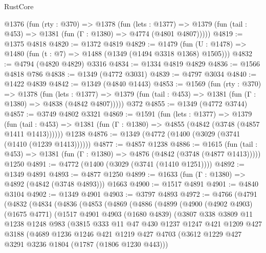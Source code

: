 \begin{lexlean}{RustCore}
\begin{coremodule}
  @1376
    (fun (rty : @370) =>
    @1378
      (fun (lets : @1377) =>
      @1379 (fun (tail : @453) => @1381 (fun (Γ : @1380) => @4774 (@4801 @4807)))))
@4819 := @1375 @4818
@4820 := @1372 @4819
@4829 := @1479 (fun (U : @1478) => @1480 (fun (t : @7) => @1488 (@1349 (@1494 @3318 @1368) @1505)))
@4832 := @4794 (@4820 @4829) @3316
@4834 := @1334 @4819 @4829
@4836 := @1566 @4818 @786
@4838 := @1349 (@4772 @3031)
@4839 := @4797 @3034
@4840 := @1422 @4839
@4842 := @1349 (@4840 @1443)
@4853 := @1569
    (fun (rty : @370) =>
    @1378
      (fun (lets : @1377) =>
      @1379 (fun (tail : @453) => @1381 (fun (Γ : @1380) => @4838 (@4842 @4807)))))
    @372
@4855 := @1349 (@4772 @3744)
@4857 := @3749 @4802 @3321
@4869 := @1591
    (fun (lets : @1377) =>
    @1379
      (fun (tail : @453) => @1381 (fun (Γ : @1380) => @4855 (@4842 (@3748 (@4857 @1411 @1413))))))
    @1238
@4876 := @1349 (@4772 (@1400 (@3029 (@3741 (@1410 (@1239 @1413))))))
@4877 := @4857 @1238
@4886 := @1615
    (fun (tail : @453) => @1381 (fun (Γ : @1380) => @4876 (@4842 (@3748 (@4877 @1413)))))
    @1250
@4891 := @4772 (@1400 (@3029 (@3741 (@1410 @1251))))
@4892 := @1349 @4891
@4893 := @4877 @1250
@4899 := @1633 (fun (Γ : @1380) => @4892 (@4842 (@3748 @4893))) @1663
@4900 := @1517 @4891
@4901 := @4840 @3104
@4902 := @1349 @4901
@4903 := @3797 @4893
@4972 := @4766
    (@4791
      (@4832
        (@4834
          (@4836
            (@4853
              (@4869
                (@4886
                  (@4899
                    (@4900
                      (@4902 @4903)
                      (@1675 @4771)
                      (@1517
                        @4901
                        @4903
                        (@1680 @4839)
                        (@3807
                          @338
                          @3809
                          @11
                          @1238
                          @1248
                          @983
                          (@3815
                            @333
                            @11
                            @47
                            @430
                            @1237
                            @1247
                            @421
                            @1209
                            @427
                            @3188
                            (@4689
                              @1236
                              @1246
                              @421
                              @1219
                              @427
                              @4703
                              (@3612 @1229 @427 @3291 @3236 @1804 (@1787 (@1806 @1230 @443)))

\end{coremodule}
\end{lexlean}
